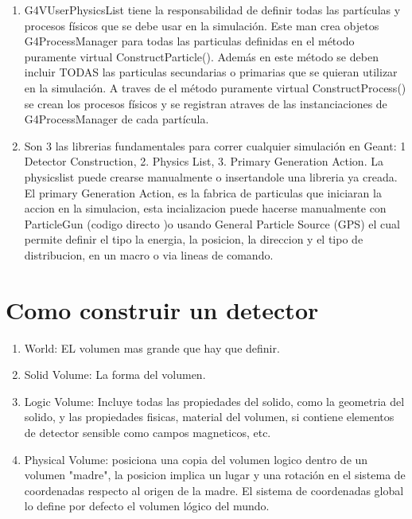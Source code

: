 \documentclass[10pt,a4paper,oneside]{book}
\begin{document}
\begin{enumerate}
\item G4VUserPhysicsList tiene la responsabilidad de definir todas las
  partículas y procesos físicos que se debe usar en la
  simulación. Este man crea objetos G4ProcessManager para todas las
  particulas definidas en el método puramente virtual
  ConstructParticle(). Además en este método se deben incluir TODAS
  las particulas secundarias o primarias que se quieran utilizar en la
  simulación. A traves de el método puramente virtual
  ConstructProcess() se crean los procesos físicos y se registran
  atraves de las instanciaciones de G4ProcessManager de cada partícula.
\item Son 3 las librerias fundamentales para correr cualquier
  simulación en Geant: 1 Detector Construction, 2. Physics List,
  3. Primary Generation Action. La physicslist puede crearse
  manualmente o insertandole una libreria ya creada. El primary
  Generation Action, es la fabrica de particulas que iniciaran la
  accion en la simulacion, esta incializacion puede hacerse
  manualmente con ParticleGun (codigo directo )o usando General
  Particle Source (GPS) el cual permite definir el tipo la energia, la
  posicion, la direccion y el tipo de distribucion, en un macro o via
  lineas de comando.
\end{enumerate}

\section*{Como construir un detector}
\begin{enumerate}
\item World: EL volumen mas grande que hay que definir.
\item Solid Volume: La forma del volumen.
\item Logic Volume: Incluye todas las propiedades del solido, como la
  geometria del solido, y las propiedades fisicas, material del
  volumen, si contiene elementos de detector sensible como campos
  magneticos, etc.
\item Physical Volume: posiciona una copia del volumen logico dentro
  de un volumen "madre", la posicion implica un lugar y una rotación
  en el sistema de coordenadas respecto al origen de la madre. El
  sistema de coordenadas global  lo define por defecto el volumen
  lógico del mundo.
\end{enumerate}
\end{document}
